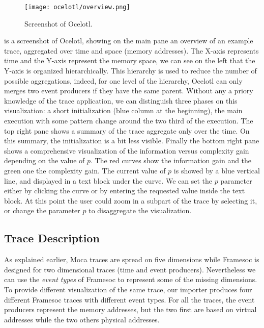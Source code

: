 \begin{figure}[htb]
    \centering
    \texttt{[image: ocelotl/overview.png]}
    \caption{Screenshot of Ocelotl.}
    \label{fig:ocelotl-overview}
\end{figure}

 is a screenshot of \gls{Ocelotl}, showing on the main pane an overview of an example trace, aggregated over time and space (memory addresses).
The X-axis represents time and the Y-axis represent the memory space, we can see on the left that the Y-axis is organized hierarchically.
This hierarchy is used to reduce the number of possible aggregations, indeed, for one level of the hierarchy, \gls{Ocelotl} can only merges two event producers if they have the same parent.
Without any a priory knowledge of the trace application, we can distinguish three phases on this visualization: a short initialization (blue column at the beginning), the main execution with some pattern change around the two third of the execution.
The top right pane shows a summary of the trace aggregate only over the time.
On this summary, the initialization is a bit less visible.
Finally the bottom right pane shows a comprehensive visualization of the information versus complexity gain depending on the value of $p$.
The red curves show the information gain and the green one the complexity gain.
The current value of $p$ is showed by a blue vertical line, and displayed in a text block under the curve.
We can set the $p$ parameter either by clicking the curve or by entering the requested value inside the text block.
At this point the user could zoom in a subpart of the trace by selecting it, or change the parameter $p$ to disaggregate the visualization.

\subsection{Trace Description}

As explained earlier, \gls{Moca} traces are spread on five dimensions while \gls{Framesoc} is designed for two dimensional traces (time and event producers).
Nevertheless we can use the \emph{event types} of \gls{Framesoc} to represent some of the missing dimensions.
To provide different visualization of the same trace, our importer produces four different \gls{Framesoc} traces with different event types.
For all the traces, the event producers represent the memory addresses, but the two first are based on virtual addresses while the two others physical addresses.

